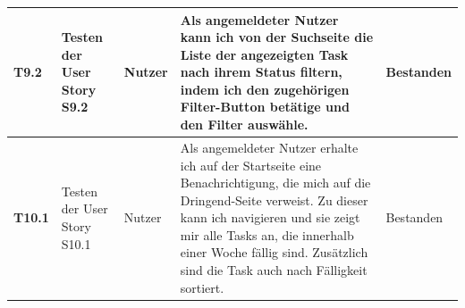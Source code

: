 \documentclass[a4paper,11pt]{article}
\begin{document}
\begin{longtable}{|p{3.3cm}|p{3.3cm}|p{3.3cm}|p{5.5cm}|p{3.3cm}|}
    \textbf{T9.2} &                                                                                                                                                                                    
	Testen der User Story S9.2 &                                                                                                                                                                    
	Nutzer &                                                                                                                                                                                             
	Als angemeldeter Nutzer kann ich von der Suchseite die Liste der angezeigten Task nach ihrem Status filtern, indem ich den zugehörigen Filter-Button betätige und den Filter auswähle.&                                                                                                  
	Bestanden
	\\
	\hline
    \textbf{T10.1} &                                                                                                                                                                                    
	Testen der User Story S10.1 &                                                                                                                                                                    
	Nutzer &                                                                                                                                                                                             
	Als angemeldeter Nutzer erhalte ich auf der Startseite eine Benachrichtigung, die mich auf die Dringend-Seite verweist. Zu dieser kann ich navigieren und sie zeigt mir alle Tasks an, die innerhalb einer Woche fällig sind. Zusätzlich sind die Task auch nach Fälligkeit sortiert.&                                                                                                  
	Bestanden
	\\
	\hline


\end{longtable}
\end{document}
